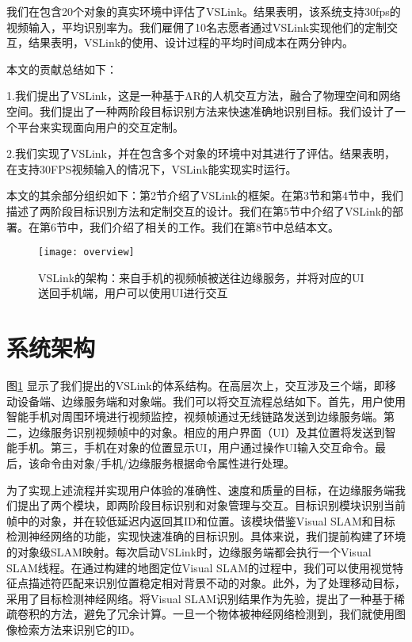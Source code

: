 我们在包含20个对象的真实环境中评估了VSLink。结果表明，该系统支持30fps的视频输入，平均识别率为{\acc}。我们雇佣了10名志愿者通过VSLink实现他们的定制交互，结果表明，VSLink的使用、设计过程的平均时间成本在两分钟内。

本文的贡献总结如下：

1.我们提出了VSLink，这是一种基于AR的人机交互方法，融合了物理空间和网络空间。我们提出了一种两阶段目标识别方法来快速准确地识别目标。我们设计了一个平台来实现面向用户的交互定制。

2.我们实现了VSLink，并在包含多个对象的环境中对其进行了评估。结果表明，在支持30FPS视频输入的情况下，VSLink能实现实时运行。

本文的其余部分组织如下：第2节介绍了VSLink的框架。在第3节和第4节中，我们描述了两阶段目标识别方法和定制交互的设计。我们在第5节中介绍了VSLink的部署。在第6节中，我们介绍了相关的工作。我们在第8节中总结本文。

\begin{figure}[t]
	\centering
	\texttt{[image: overview]}
	\caption{VSLink的架构：来自手机的视频帧被送往边缘服务，并将对应的UI送回手机端，用户可以使用UI进行交互}
	\label{fig:overview}
\end{figure}

\chapter{系统架构}\label{sec:architec}


图\ref{fig:overview} 显示了我们提出的VSLink的体系结构。在高层次上，交互涉及三个端，即移动设备端、边缘服务端和对象端。我们可以将交互流程总结如下。首先，用户使用智能手机对周围环境进行视频监控，视频帧通过无线链路发送到边缘服务端。第二，边缘服务识别视频帧中的对象。相应的用户界面（UI）及其位置将发送到智能手机。第三，手机在对象的位置显示UI，用户通过操作UI输入交互命令。最后，该命令由对象/手机/边缘服务根据命令属性进行处理。

为了实现上述流程并实现用户体验的准确性、速度和质量的目标，在边缘服务端我们提出了两个模块，即两阶段目标识别和对象管理与交互。目标识别模块识别当前帧中的对象，并在较低延迟内返回其ID和位置。该模块借鉴Visual SLAM和目标检测神经网络的功能，实现快速准确的目标识别。具体来说，我们提前构建了环境的对象级SLAM映射。每次启动VSLink时，边缘服务端都会执行一个Visual SLAM线程。在通过构建的地图定位Visual SLAM的过程中，我们可以使用视觉特征点描述符匹配来识别位置稳定相对背景不动的对象。此外，为了处理移动目标，采用了目标检测神经网络。将Visual SLAM识别结果作为先验，提出了一种基于稀疏卷积的方法，避免了冗余计算。一旦一个物体被神经网络检测到，我们就使用图像检索方法来识别它的ID。

